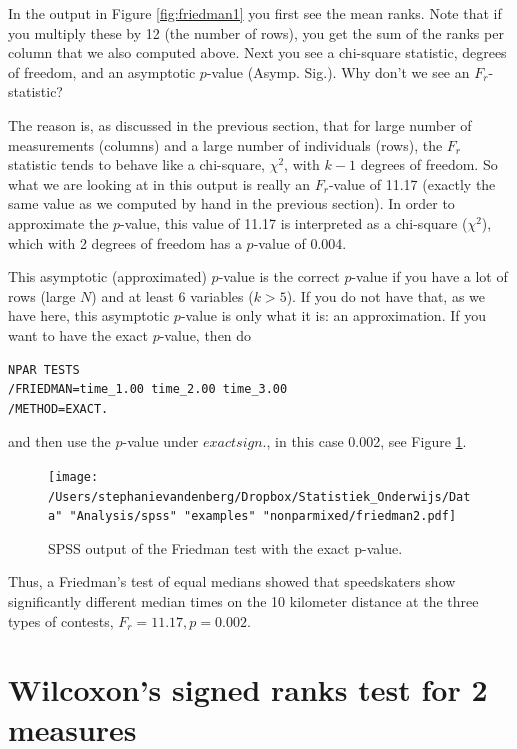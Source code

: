 \documentclass[]{report}\usepackage[]{graphicx}\usepackage[]{color}
\begin{document}
In the output in Figure \ref{fig:friedman1} you first see the mean ranks. Note that if you multiply these by 12 (the number of rows), you get the sum of the ranks per column that we also computed above. Next you see a chi-square statistic, degrees of freedom, and an asymptotic $p$-value (Asymp. Sig.). Why don't we see an $F_r$-statistic?

The reason is, as discussed in the previous section, that for large number of measurements (columns) and a large number of individuals (rows), the $F_r$ statistic tends to behave like a chi-square, $\chi^2$, with $k-1$ degrees of freedom. So what we are looking at in this output is really an $F_r$-value of 11.17 (exactly the same value as we computed by hand in the previous section). In order to approximate the $p$-value, this value of 11.17 is interpreted as a chi-square ($\chi^2$), which with 2 degrees of freedom has a $p$-value of 0.004.


This asymptotic (approximated) $p$-value is the correct $p$-value if you have a lot of rows (large $N$) and at least 6 variables ($k>5$). If you do not have that, as we have here, this asymptotic $p$-value is only what it is: an approximation. If you want to have the exact $p$-value, then do

\begin{verbatim}
NPAR TESTS
/FRIEDMAN=time_1.00 time_2.00 time_3.00
/METHOD=EXACT.
\end{verbatim}

and then use the $p$-value under $exact sign.$, in this case 0.002, see Figure \ref{fig:friedman2}.

\begin{figure}[h]
    \begin{center}
       \texttt{[image: /Users/stephanievandenberg/Dropbox/Statistiek\_Onderwijs/Data" "Analysis/spss" "examples" "nonparmixed/friedman2.pdf]}
    \end{center}
    \caption{SPSS output of the Friedman test with the exact p-value.}
    \label{fig:friedman2}
\end{figure}


Thus, a Friedman's test of equal medians showed that speedskaters show significantly different median times on the 10 kilometer distance at the three types of contests, $F_r=11.17, p=0.002$.



\section{Wilcoxon's signed ranks test for 2 measures}
\end{document}
